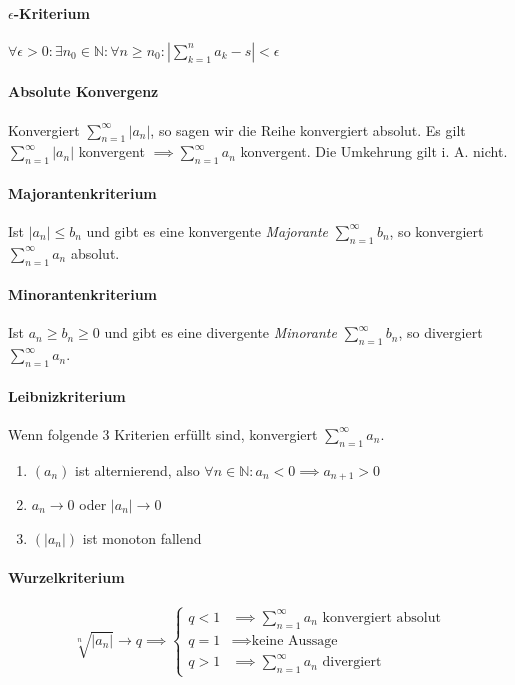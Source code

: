 \documentclass[a4paper, 9pt, DIV=24]{scrartcl}
\newcommand{\N}{\mathbb{N}}
\begin{document}
\paragraph{$\epsilon$-Kriterium}
$\forall \epsilon > 0: \exists n_0 \in \N: \forall n \geq n_0: | \sum_{k=1}^n a_k - s | < \epsilon$

\paragraph{Absolute Konvergenz}
Konvergiert $\sum_{n=1}^\infty |a_n|$, so sagen wir die Reihe konvergiert absolut.
Es gilt $\sum_{n=1}^\infty |a_n|$ konvergent $ \implies \sum_{n=1}^\infty a_n$ konvergent.
Die Umkehrung gilt i. A. nicht.

\paragraph{Majorantenkriterium}
Ist $|a_n| \leq b_n$ und gibt es eine konvergente \emph{Majorante} $\sum_{n=1}^\infty b_n$, so konvergiert $\sum_{n=1}^\infty a_n$ absolut.

\paragraph{Minorantenkriterium}
Ist $a_n \geq b_n \geq 0$ und gibt es eine divergente \emph{Minorante} $\sum_{n=1}^\infty b_n$, so divergiert $\sum_{n=1}^\infty a_n$.

\paragraph{Leibnizkriterium}
Wenn folgende 3 Kriterien erfüllt sind, konvergiert $\sum_{n=1}^\infty a_n$.
\begin{enumerate}[label={(}\arabic*{)}]
  \item $(a_n)$ ist alternierend, also $\forall n\in\N: a_n < 0 \implies a_{n+1} > 0$
  \item $a_n \to 0$ oder $|a_n| \to 0$
  \item $(|a_n|)$ ist monoton fallend
\end{enumerate}

\paragraph{Wurzelkriterium}
\[
  \sqrt[n]{\left | a_n \right |} \to q \implies
  \begin{cases}
    q < 1 & \implies \sum_{n=1}^\infty a_n \text{ konvergiert absolut}\\
    q = 1 & \implies \text{keine Aussage}\\
    q > 1 & \implies \sum_{n=1}^\infty a_n \text{ divergiert}
  \end{cases}
\]
\end{document}
